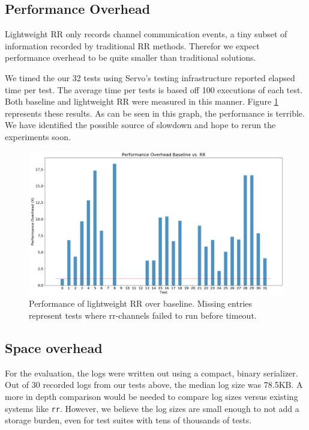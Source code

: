 \documentclass{article}
\begin{document}
\subsection{Performance Overhead}
Lightweight RR only records channel communication events, a tiny subset of information
recorded by traditional RR methods. Therefor we expect performance overhead to be quite
smaller than traditional solutions.

We timed the our 32 tests using Servo's testing infrastructure reported elapsed time
per test. The average time per tests is based off 100 executions of each test. Both
baseline and lightweight RR were measured in this manner. Figure \ref{fig:result_timing}
represents these results. As can be seen in this graph, the performance is terrible.
We have identified the possible source of slowdown and hope to rerun the experiments
soon.

\begin{figure}
  \includegraphics[width=\linewidth]{result_timing.png}
  \caption{Performance of lightweight RR over baseline. Missing entries represent
  tests where rr-channels failed to run before timeout.}
  \label{fig:result_timing}
\end{figure}

\subsection{Space overhead}
For the evaluation, the logs were written out using a compact, binary serializer.
Out of 30 recorded logs from our tests above, the median log size was 78.5KB.
A more in depth comparison would be needed to compare log sizes versus existing
systems like \texttt{rr}. However, we believe the log sizes are small enough to
not add a storage burden, even for test suites with tens of thousands of tests.
\end{document}
